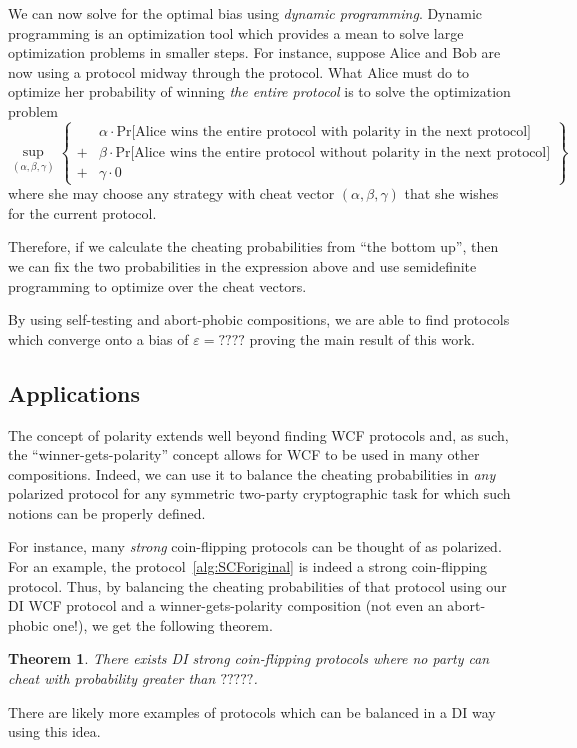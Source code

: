 \documentclass[11pt]{article}
\newtheorem{theorem}{Theorem}
\newcommand{\eps}{\varepsilon}
\begin{document}
We can now solve for the optimal bias using \emph{dynamic programming}.  
Dynamic programming is an optimization tool which provides a mean to solve large optimization problems in smaller steps. 
For instance, suppose Alice and Bob are now using a protocol midway through the protocol. 
What Alice must do to optimize her probability of winning \emph{the entire protocol} is to solve the optimization problem 
\begin{equation} 
\sup_{(\alpha, \beta, \gamma)} 
\left\{ \begin{array}{rlll} 
 & \alpha \cdot \text{Pr[Alice wins the entire protocol with polarity in the next protocol]} \\ 
+ & \beta \cdot \text{Pr[Alice wins the entire protocol without polarity in the next protocol]} \\ 
+ & \gamma \cdot 0 
\end{array} \right\}  
\end{equation} 
where she may choose any strategy with cheat vector $(\alpha, \beta, \gamma)$ that she wishes for the current protocol. 

Therefore, if we calculate the cheating probabilities from ``the bottom up'', then we can fix the two probabilities in the expression above and use semidefinite programming to optimize over the cheat vectors. 

By using self-testing and abort-phobic compositions, we are able to find protocols which converge onto a bias of $\eps = ????$ proving the main result of this work. 


\subsection{Applications} 

The concept of polarity extends well beyond finding WCF protocols and, as such, the ``winner-gets-polarity'' concept allows for WCF to be used in many other compositions. 
Indeed, we can use it to balance the cheating probabilities in  \emph{any} polarized protocol for any symmetric two-party cryptographic task for which such notions can be properly defined. 
 
For instance, many \emph{strong} coin-flipping protocols can be thought of as polarized. 
For an example, the protocol~\ref{alg:SCForiginal} is indeed a strong coin-flipping protocol. 
Thus, by balancing the cheating probabilities of that protocol using our DI WCF protocol and a winner-gets-polarity composition (not even an abort-phobic one!), we get the following theorem. 

\begin{theorem} 
There exists DI strong coin-flipping protocols where no party can cheat with probability greater than $?????$.  
\end{theorem} 

There are likely more examples of protocols which can be balanced in a DI way using this idea. 
     
\end{document}
